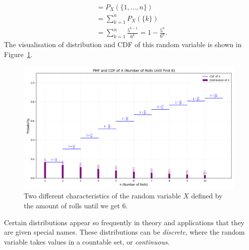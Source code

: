 \begin{example}
\begin{itemize}
\[\begin{aligned}
                &= P_X(\{1, \dots, n\}) \\
                &= \sum_{k=1}^n P_X(\{k\}) \\
                &= \sum_{k=1}^n \frac{5^{k-1}}{6^k} = 1 - \frac{5^n}{6^n}.
            \end{aligned}
        \]
        The visualisation of distribution and CDF of this random variable is shown in Figure~\ref{fig:figure-distribution-random-variable-2}.
        \begin{figure}[h]
            \centering
            \includegraphics[scale=0.35]{chapter-1/sections/img_1}
            \caption{Two different characteristics of the random variable $X$ defined by the amount of rolls until we get $6$.\label{fig:figure-distribution-random-variable-2}}
        \end{figure}
    \end{itemize}
\end{example}

Certain distributions appear so frequently in theory and applications that they are given special names. These distributions can be \emph{discrete}, where the random variable takes values in a countable set, or \emph{continuous}.

